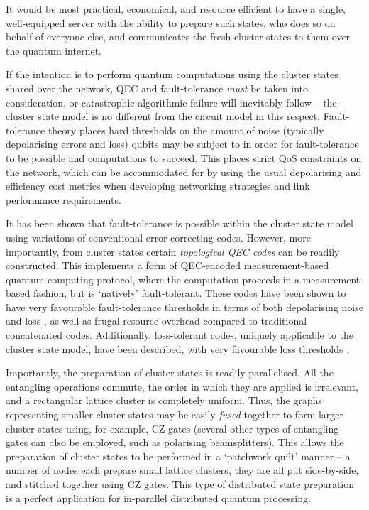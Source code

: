 \documentclass[aps,rmp,twocolumn,amsmath,amssymb,nofootinbib,superscriptaddress,longbibliography,floatfix]{revtex4-1}
\begin{document}
It would be most practical, economical, and resource efficient to have a single, well-equipped server with the ability to prepare such states, who does so on behalf of everyone else, and communicates the fresh cluster states to them over the quantum internet.

If the intention is to perform quantum computations using the cluster states shared over the network, QEC and fault-tolerance \emph{must} be taken into consideration, or catastrophic algorithmic failure will inevitably follow -- the cluster state model is no different from the circuit model in this respect. Fault-tolerance theory places hard thresholds on the amount of noise (typically depolarising errors and loss) qubits may be subject to in order for fault-tolerance to be possible and computations to succeed. This places strict QoS constraints on the network, which can be accommodated for by using the usual depolarising and efficiency cost metrics when developing networking strategies and link performance requirements.

It has been shown that fault-tolerance is possible within the cluster state model \cite{bib:NielsenDawson04, bib:Dawson06} using variations of conventional error correcting codes. However, more importantly, from cluster states certain \emph{topological QEC codes} \cite{???} can be readily constructed. This implements a form of QEC-encoded measurement-based quantum computing protocol, where the computation proceeds in a measurement-based fashion, but is `natively' fault-tolerant. These codes have been shown to have very favourable fault-tolerance thresholds in terms of both depolarising noise and loss \cite{bib:StaceBarrettDohertyLoss, bib:BarrettStaceFT}, as well as frugal resource overhead compared to traditional concatenated codes. Additionally, loss-tolerant codes, uniquely applicable to the cluster state model, have been described, with very favourable loss thresholds \cite{bib:Varnava05, bib:RalphHayes05}.

Importantly, the preparation of cluster states is readily parallelised. All the entangling operations commute, the order in which they are applied is irrelevant, and a rectangular lattice cluster is completely uniform. Thus, the graphs representing smaller cluster states may be easily \emph{fused} together to form larger cluster states using, for example, CZ gates (several other types of entangling gates can also be employed, such as polarising beamsplitters). This allows the preparation of cluster states to be performed in a `patchwork quilt' manner -- a number of nodes each prepare small lattice clusters, they are all put side-by-side, and stitched together using CZ gates. This type of distributed state preparation is a perfect application for in-parallel distributed quantum processing.
\end{document}
